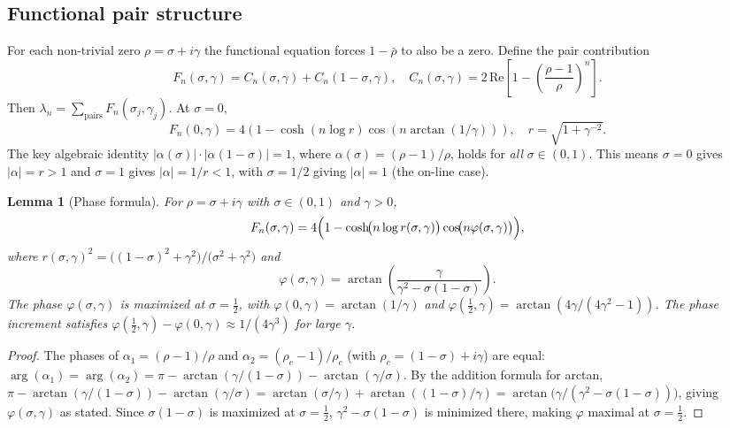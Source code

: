 \documentclass[11pt]{article}
\newtheorem{lemma}[theorem]{Lemma}
\begin{document}
\subsection{Functional pair structure}

For each non-trivial zero $\rho = \sigma + i\gamma$ the functional equation forces $1-\bar{\rho}$ to also be a zero. Define the pair contribution
\[
  F_n(\sigma,\gamma) = C_n(\sigma,\gamma) + C_n(1-\sigma,\gamma), \quad
  C_n(\sigma,\gamma) = 2\,\mathrm{Re}\!\left[1-\left(\frac{\rho-1}{\rho}\right)^n\right].
\]
Then $\lambda_n = \sum_{\text{pairs}} F_n(\sigma_j,\gamma_j)$. At $\sigma = 0$,
\[
  F_n(0,\gamma) = 4\!\left(1 - \cosh(n\log r)\cos(n\arctan(1/\gamma))\right), \quad
  r = \sqrt{1 + \gamma^{-2}}.
\]
The key algebraic identity $|\alpha(\sigma)|\cdot|\alpha(1-\sigma)| = 1$, where
$\alpha(\sigma) = (\rho-1)/\rho$, holds for \emph{all} $\sigma\in(0,1)$. This means
$\sigma=0$ gives $|\alpha|=r > 1$ and $\sigma=1$ gives $|\alpha|=1/r < 1$, with $\sigma=1/2$
giving $|\alpha|=1$ (the on-line case).

\begin{lemma}[Phase formula]
\label{lem:phase_formula}
For $\rho = \sigma + i\gamma$ with $\sigma \in (0,1)$ and $\gamma > 0$,
\[
  F_n(\sigma,\gamma) = 4\Bigl(1 - \cosh\!\bigl(n\log r(\sigma,\gamma)\bigr)\cos\!\bigl(n\varphi(\sigma,\gamma)\bigr)\Bigr),
\]
where $r(\sigma,\gamma)^2 = \bigl((1{-}\sigma)^2+\gamma^2\bigr)/\bigl(\sigma^2+\gamma^2\bigr)$ and
\[
  \varphi(\sigma,\gamma) = \arctan\!\left(\frac{\gamma}{\gamma^2 - \sigma(1-\sigma)}\right).
\]
The phase $\varphi(\sigma,\gamma)$ is maximized at $\sigma = \tfrac{1}{2}$, with
$\varphi(0,\gamma) = \arctan(1/\gamma)$ and
$\varphi(\tfrac{1}{2},\gamma) = \arctan(4\gamma/(4\gamma^2-1))$.
The phase increment satisfies
$\varphi(\tfrac{1}{2},\gamma) - \varphi(0,\gamma) \approx 1/(4\gamma^3)$ for large $\gamma$.
\end{lemma}

\begin{proof}
The phases of $\alpha_1 = (\rho-1)/\rho$ and $\alpha_2 = (\rho_c-1)/\rho_c$ (with $\rho_c = (1-\sigma)+i\gamma$)
are equal:
$\arg(\alpha_1) = \arg(\alpha_2) = \pi - \arctan(\gamma/(1-\sigma)) - \arctan(\gamma/\sigma)$.
By the addition formula for arctan,
$\pi - \arctan(\gamma/(1-\sigma)) - \arctan(\gamma/\sigma)
= \arctan(\sigma/\gamma) + \arctan((1-\sigma)/\gamma)
= \arctan\!\bigl(\gamma/(\gamma^2-\sigma(1-\sigma))\bigr)$,
giving $\varphi(\sigma,\gamma)$ as stated.
Since $\sigma(1-\sigma)$ is maximized at $\sigma=\tfrac{1}{2}$, $\gamma^2-\sigma(1-\sigma)$
is minimized there, making $\varphi$ maximal at $\sigma=\tfrac{1}{2}$.
\end{proof}
\end{document}
